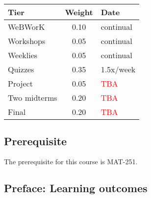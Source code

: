 \documentclass[symmetric]{tufte-handout}
\begin{document}
    \begin{minipage}[t]{0.44\linewidth}
        \vspace{0pt}
        \centering{}\vspace*{1.0ex}
        \begin{tabular}{lcl}
            \toprule
            Tier & Weight & Date \\
            \midrule
            WeBWorK       & 0.10 & continual \\
            Workshops     & 0.05 & continual \\
            Weeklies      & 0.05 & continual \\  
            Quizzes       & 0.35 & 1.5x/week \\
            Project       & 0.05 & \textcolor{red}{TBA} \\
            Two midterms  & 0.20 & \textcolor{red}{TBA} \\
            Final         & 0.20 & \textcolor{red}{TBA} \\
            \bottomrule
        \end{tabular}
    \end{minipage} \hspace*{1em}

\subsection{Prerequisite}

The prerequisite for this course is MAT-251.

\subsection{Preface: Learning outcomes} \label{ssec:prefacelearningoutcomes}
\end{document}
